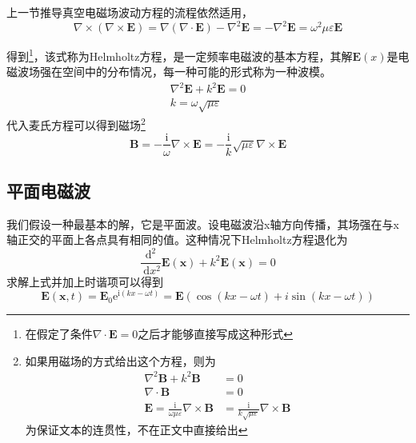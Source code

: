         上一节推导真空电磁场波动方程的流程依然适用，
        \begin{equation}
            \boxed{\nabla \times (\nabla \times \boldsymbol{E}) = \nabla(\nabla \cdot \boldsymbol{E})-\nabla^2 \boldsymbol{E}=-\nabla^2 \boldsymbol{E} = \omega^2 \mu \varepsilon \boldsymbol{E}}
        \end{equation}
        
        得到\footnote{\label{ft.4_1_3}在假定了条件$\nabla \cdot \boldsymbol{E}=0$之后才能够直接写成这种形式}，该式称为Helmholtz方程，是一定频率电磁波的基本方程，其解$\boldsymbol{E}(x)$是电磁波场强在空间中的分布情况，每一种可能的形式称为一种波模。
        \begin{equation}
            \begin{gathered}
            \nabla^{2} \boldsymbol{E}+k^{2} \boldsymbol{E}=0 \\
            k=\omega \sqrt{\mu \varepsilon}
            \end{gathered}
            \end{equation} 
        代入麦氏方程可以得到磁场\footnote{如果用磁场的方式给出这个方程，则为\[\begin{aligned}
            \nabla^{2} \boldsymbol{B}+k^{2} \boldsymbol{B} &=0 \\
            \nabla \cdot \boldsymbol{B} &=0 \\
            \boldsymbol{E}=\frac{\mathrm{i}}{\omega \mu \varepsilon} \nabla \times \boldsymbol{B} &=\frac{\mathrm{i}}{k \sqrt{\mu \varepsilon}} \nabla \times \boldsymbol{B}
            \end{aligned}\]
            为保证文本的连贯性，不在正文中直接给出}
        \begin{equation}
            \label{eq.4.11}
            \boldsymbol{B}=-\frac{\mathrm{i}}{\omega} \nabla \times \boldsymbol{E}=-\frac{\mathrm{i}}{k} \sqrt{\mu \varepsilon} \nabla \times \boldsymbol{E}
        \end{equation}
    \subsection{平面电磁波}      
        我们假设一种最基本的解，它是平面波。设电磁波沿x轴方向传播，其场强在与x轴正交的平面上各点具有相同的值。这种情况下Helmholtz方程退化为
        \begin{equation}
            \frac{\mathrm{d}^{2}}{\mathrm{~d} x^{2}} \boldsymbol{E}(\boldsymbol{x})+k^{2} \boldsymbol{E}(\boldsymbol{x})=0
        \end{equation}
        求解上式并加上时谐项可以得到
        \begin{equation}
            \boldsymbol{E}(\boldsymbol{x}, t)=\boldsymbol{E}_{0} \mathrm{e}^{\mathrm{i}(k x-\omega t)} = \boldsymbol{E}(\cos(kx-\omega t)+i \sin(kx-\omega t))
        \end{equation}

